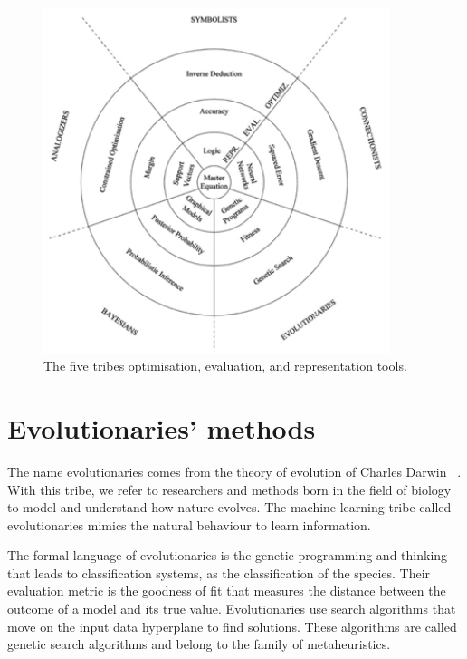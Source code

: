 \begin{figure}[hbt!]
\centering
\includegraphics[width=0.9\textwidth]{SectionLetsMath/nonLinearMethods_fig/fig_tribes.png}
\captionsetup{type=figure}
\caption{The five tribes optimisation, evaluation, and representation tools.}
\label{fig_tribes}
\end{figure}


\section{Evolutionaries’ methods}

The name evolutionaries comes from the theory of evolution of Charles Darwin ~\cite{Darwin1859}. With this tribe, we refer to researchers and methods born in the field of biology to model and understand how nature evolves. The machine learning tribe called evolutionaries mimics the natural behaviour to learn information.\par

The formal language of evolutionaries is the genetic programming and thinking that leads to classification systems, as the classification of the species. Their evaluation metric is the goodness of fit that measures the distance between the outcome of a model and its true value. Evolutionaries use search algorithms that move on the input data hyperplane to find solutions. These algorithms are called genetic search algorithms and belong to the family of metaheuristics.

